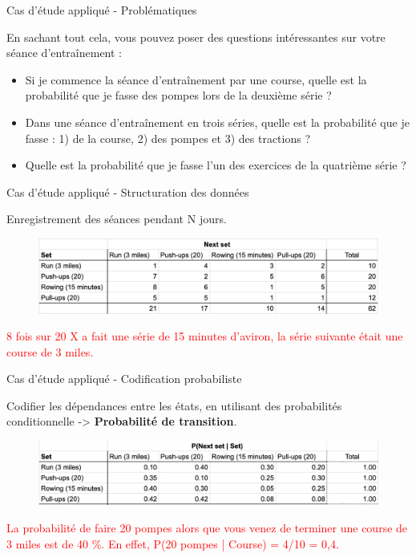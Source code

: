 \documentclass[aspectratio=169,xcolor=dvipsnames, t]{beamer}
\begin{document}
\begin{frame}{Cas d'étude appliqué - Problématiques}
	
	En sachant tout cela, vous pouvez poser des questions intéressantes sur votre séance d'entraînement :
	
	\begin{itemize}
		\item Si je commence la séance d'entraînement par une course, quelle est la probabilité que je fasse des pompes lors de la deuxième série ?
		\item Dans une séance d'entraînement en trois séries, quelle est la probabilité que je fasse : 1) de la course, 2) des pompes et 3) des tractions ?
		\item Quelle est la probabilité que je fasse l'un des exercices de la quatrième série ?
	\end{itemize}
	
	
\end{frame}
\begin{frame}{Cas d'étude appliqué - Structuration des données}
	
	Enregistrement des séances pendant N jours.
	\vspace{0.5cm}
	\begin{figure}
		\includegraphics[height=0.35\paperheight]{figures/entrainementLogs.png}
	\end{figure}
	\textcolor{red}{8 fois sur 20 X a fait une série de 15 minutes d'aviron, la série suivante était une course de 3 miles.}

\end{frame}


\begin{frame}{Cas d'étude appliqué - Codification probabiliste}
	
	Codifier les dépendances entre les états, en utilisant des probabilités conditionnelle -> \textbf{Probabilité de transition}.

	\begin{figure}
		\includegraphics[height=0.3\paperheight]{figures/entrainementLogsEnconded.png}
	\end{figure}
	\textcolor{red}{La probabilité de faire 20 pompes alors que vous venez de terminer une course de 3 miles est de 40 \%. En effet, P(20 pompes | Course) = 4/10 = 0,4.}
	
\end{frame}
\end{document}
